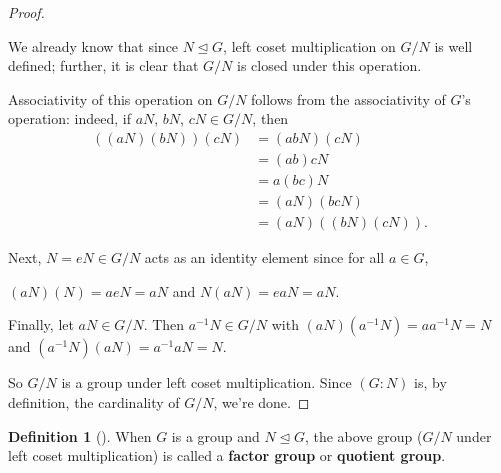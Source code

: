 \documentclass[10pt,openany,oneside]{book}
\newcommand{\terminology}[1]{\textbf{#1}}
\theoremstyle{plain}
\theoremstyle{definition}
\newtheorem{definition}[theorem]{Definition}
\theoremstyle{definition}
\theoremstyle{definition}
\theoremstyle{definition}
\numberwithin{equation}{section}
\newcommand{\amp}{&}
\begin{document}
\begin{proof}\hypertarget{proof-44}{}
We already know that since \(N\unlhd G\), left coset multiplication on \(G/N\) is well defined; further, it is clear that \(G/N\) is closed under this operation.%
\par
Associativity of this operation on \(G/N\) follows from the associativity of \(G\)'s operation: indeed, if \(aN\), \(bN\), \(cN \in
G/N\), then%
\begin{align*}
((aN)(bN))(cN)\amp =(abN)(cN)\\
\amp =(ab)cN\\
\amp =a(bc)N\\
\amp =(aN)(bcN)\\
\amp =(aN)((bN)(cN)).
\end{align*}
%
\par
Next, \(N=eN\in G/N\) acts as an identity element since for all \(a\in
G\),%
\par
\((aN)(N)=aeN=aN\) and \(N(aN)=eaN=aN\).%
\par
Finally, let \(aN\in G/N\). Then \(a^{-1}N\in G/N\) with \((aN)(a^{-1}N)=aa^{-1}N=N\) and \((a^{-1}N)(aN)=a^{-1}aN=N\).%
\par
So \(G/N\) is a group under left coset multiplication. Since \((G:N)\) is, by definition, the cardinality of \(G/N\), we're done.%
\end{proof}
\begin{definition}[{}]\label{definition-68}
\label{notation-76}
When \(G\) is a group and \(N\unlhd G\), the above group (\(G/N\) under left coset multiplication) is called a \terminology{factor group} or \terminology{quotient group}.%
\end{definition}
\end{document}
